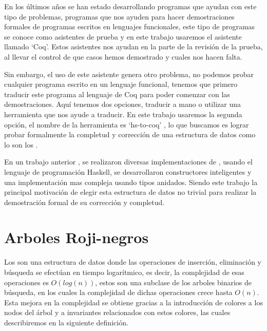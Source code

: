En los últimos años se han estado desarrollando programas que ayudan con este tipo de problemas,
programas que nos ayuden para hacer demostraciones formales de programas escritos en lenguajes
funcionales, este tipo de programas se conoce como asistentes de prueba y en este trabajo usaremos
el asistente llamado `Coq'. Estos asistentes nos ayudan en la parte de la revisi\'on de la prueba,
al llevar el control de que casos hemos demostrado y cuales nos hacen falta.

Sin embargo, el uso de este asistente genera otro problema, no podemos probar cualquier programa
escrito en un lenguaje funcional, tenemos que primero traducir este programa al lenguaje de Coq
para poder comenzar con las demostraciones. Aquí tenemos dos opciones, traducir a mano o utilizar
una herramienta que nos ayude a traducir. En este trabajo usaremos la segunda opci\'on, el nombre
de la herramienta es `hs-to-coq' \cite{thrc}, lo que buscamos es lograr probar formalmente la
completud y correcci\'on de una estructura de datos como lo son los {\arns}.

En un trabajo anterior \cite{tesisG}, se realizaron diversas implementaciones de {\arns}, usando el
lenguaje de programaci\'on Haskell, se desarrollaron constructores inteligentes y una
implementaci\'on mas compleja usando tipos anidados. Siendo este trabajo la principal motivaci\'on
de elegir esta estructura de datos no trivial para realizar la demostraci\'on formal de su
corrección y completud.

\section{Arboles Roji-negros}
Los {\arns} son una estructura de datos donde las operaciones de inserci\'on, eliminaci\'on y
búsqueda se efectúan en tiempo logarítmico, es decir, la complejidad de esas operaciones es
$O(log(n))$, estos son una subclase de los arboles binarios de búsqueda, en los cuales la
complejidad de dichas operaciones crece hasta $O(n)$. Esta mejora en la complejidad se obtiene
gracias a la introducción de colores a los nodos del \'arbol y a invariantes relacionados con estos
colores, las cuales describiremos en la siguiente definici\'on.

